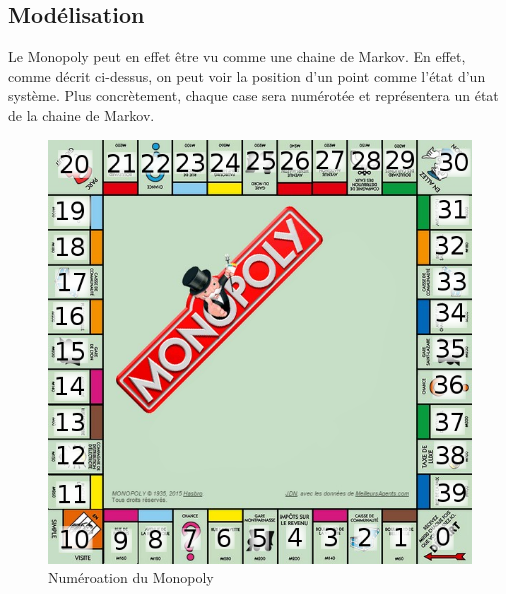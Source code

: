 \documentclass[letterpaper]{article}
\begin{document}
  \subsection{Modélisation}
    Le Monopoly peut en effet être vu comme une chaine de Markov.  En effet, comme décrit
    ci-dessus, on peut voir la position d'un point comme l'état d'un système.  Plus 
    concrètement, chaque case sera numérotée et représentera un état de la chaine de Markov.
    \begin{figure}[h]
      \centering
      \includegraphics[scale=0.4]{./Images/Monopoly.png}
	\caption{Numéroation du Monopoly \citep{IMG_Monopoly}}
    \end{figure}
    
\end{document}
